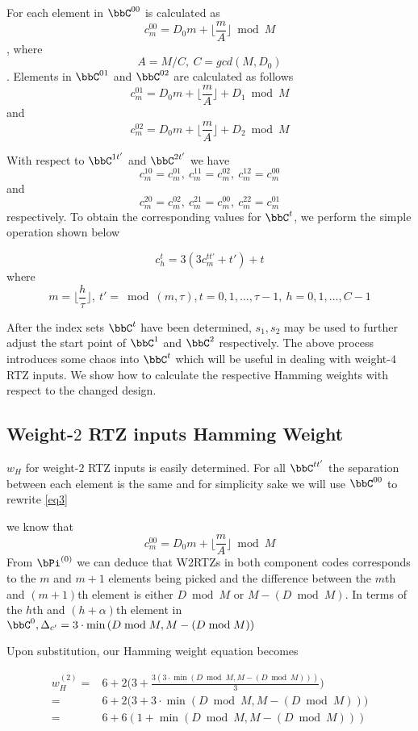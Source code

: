  For each element in $\bbC^{00}$ is calculated as $$c_m^{00}=D_0m+\lfloor \frac{m}{A} \rfloor \bmod M $$, where $$A=M/C,~C=gcd(M,D_0)$$.
 Elements in  $\bbC^{01}$ and $\bbC^{02}$ are calculated as follows
 $$c_m^{01}=D_0m+\lfloor \frac{m}{A} \rfloor+D_1 \bmod M $$
 and
 $$c_m^{02}=D_0m+\lfloor \frac{m}{A} \rfloor +D_2\bmod M $$
 
 With respect to $\bbC^{1t'}$ and $\bbC^{2t'}$ we have 
$$ c_m^{10}=c_m^{01},~c_m^{11}=c_m^{02},~c_m^{12}=c_m^{00}$$ and
$$ c_m^{20}=c_m^{02},~c_m^{21}=c_m^{00},~c_m^{22}=c_m^{01}$$
respectively.
To obtain the corresponding values for $\bbC^t$, we perform the simple operation shown below
 
 \begin{equation} 
 c^{t}_h=3(3c^{tt'}_{m}+t')+t
 \label{eq12}
 \end{equation} 
 where $$ m=\Big \lfloor \frac{h}{\tau} \Big \rfloor, ~t'=\bmod(m,\tau),t=0,1,...,\tau-1,~h=0,1,...,C-1$$
 
 After the index sets $\bbC^t$ have been determined, $s_1,s_2$ may be used to further adjust the start point of $\bbC^1$ and $\bbC^2$ respectively.
 The above process introduces some chaos into $\bbC^t$ which will be useful in dealing with weight-$4$ RTZ inputs. We show how to calculate the respective Hamming weights with respect to the changed design.
 
 
 \subsection{Weight-$2$ RTZ inputs Hamming Weight}
 $w_H$ for weight-$2$ RTZ inputs is easily determined. For all $\bbC^{tt'}$ the separation between each element is the same and for simplicity sake we will use $\bbC^{00}$ to rewrite \ref{eq3}
 
 we know that $$c_m^{00}=D_0m+\lfloor \frac{m}{A} \rfloor \bmod M $$
  From $\bPi^{(0)}$ we can deduce that W2RTZs in both component codes corresponds to the $m$ and $m+1$ elements being picked and the difference between the $m$th and $(m+1)$th element is either $D \bmod M$ or $M- (D \bmod M)$. In terms of the $h$th and $(h+\alpha)$th element in $\bbC^{0}, \Delta_{c'}=3\cdot\min{(D \bmod M, M- (D \bmod M))}$

 
 
 Upon substitution, our Hamming weight equation becomes
 
 \begin{equation}
 \begin{split}
w_H^{(2)}=&6+2\Big(3+\frac{3(3\cdot \min{(D \bmod M, M- (D \bmod M))})}{3}\Big)\\
=&6+2\Big(3+3\cdot\min{(D \bmod M, M- (D \bmod M))}\Big)\\
=&6+6(1+\min{(D \bmod M, M- (D \bmod M))})
\end{split}
\end{equation}

